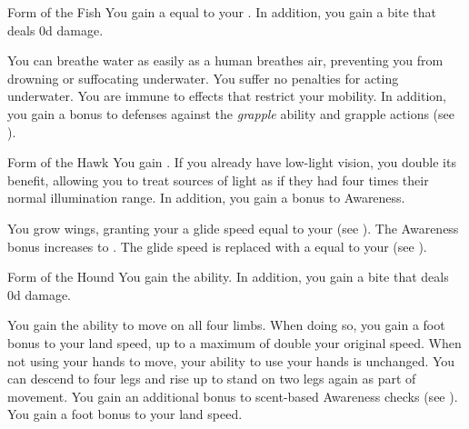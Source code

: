 {            \begin{freeability}{Form of the Fish}
                You gain a  equal to your .
                In addition, you gain a bite  that deals \plus0d damage.

                \rankline
                 You can breathe water as easily as a human breathes air, preventing you from drowning or suffocating underwater.
                 You suffer no penalties for acting underwater.
                 You are immune to  effects that restrict your mobility.
                In addition, you gain a  bonus to defenses against the \textit{grapple} ability and grapple actions (see ).
            \end{freeability}

            \begin{freeability}{Form of the Hawk}
                You gain .
                If you already have low-light vision, you double its benefit, allowing you to treat sources of light as if they had four times their normal illumination range.
                In addition, you gain a  bonus to Awareness.

                \rankline
                 You grow wings, granting your a glide speed equal to your  (see ).
                 The Awareness bonus increases to .
                 The glide speed is replaced with a  equal to your  (see ).
            \end{freeability}

            \begin{freeability}{Form of the Hound}
                You gain the  ability.
                In addition, you gain a bite  that deals \plus0d damage.

                \rankline
                 You gain the ability to move on all four limbs.
                When doing so, you gain a  foot bonus to your land speed, up to a maximum of double your original speed.
                When not using your hands to move, your ability to use your hands is unchanged.
                You can descend to four legs and rise up to stand on two legs again as part of movement.
                 You gain an additional  bonus to scent-based Awareness checks (see ).
                 You gain a  foot bonus to your land speed.
            \end{freeability}

}
